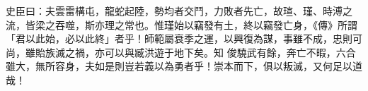 \begin{pinyinscope}
 史臣曰：夫雲雷構屯，龍蛇起陸，勢均者交鬥，力敗者先亡，故瑄、瑾、時溥之流，皆梁之吞噬，斯亦理之常也。惟瑾始以竊發有土，終以竊發亡身，《傳》所謂「君以此始，必以此終」者乎！師範屬衰季之運，以興復為謀，事雖不成，忠則可尚，雖貽族滅之禍，亦可以與臧洪遊于地下矣。知
 俊驍武有餘，奔亡不暇，六合雖大，無所容身，夫如是則豈若義以為勇者乎！崇本而下，俱以叛滅，又何足以道哉！



\end{pinyinscope}